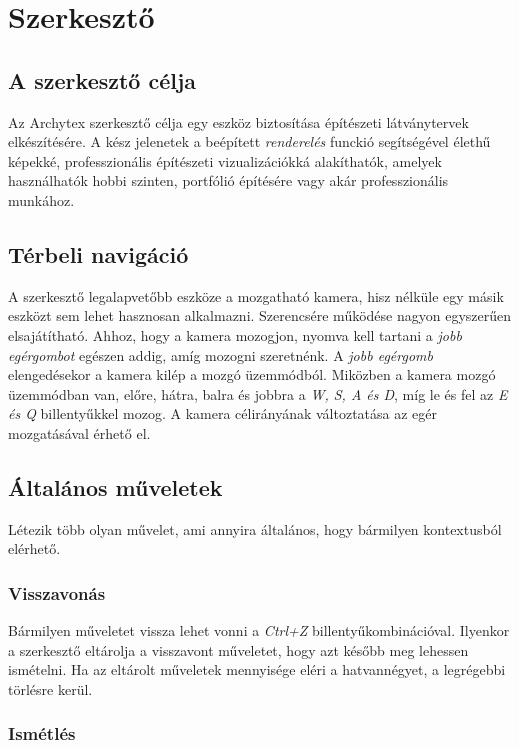 \section{Szerkesztő}

\subsection{A szerkesztő célja}

Az Archytex szerkesztő célja egy eszköz biztosítása építészeti látványtervek elkészítésére. A kész
jelenetek a beépített \emph{renderelés} funckió segítségével élethű képekké, professzionális
építészeti vizualizációkká alakíthatók, amelyek használhatók hobbi szinten, portfólió építésére vagy
akár professzionális munkához.

\subsection{Térbeli navigáció}

A szerkesztő legalapvetőbb eszköze a mozgatható kamera, hisz nélküle egy másik eszközt sem lehet
hasznosan alkalmazni. Szerencsére működése nagyon egyszerűen elsajátítható. Ahhoz, hogy a kamera
mozogjon, nyomva kell tartani a \emph{jobb egérgombot} egészen addig, amíg mozogni szeretnénk.
A \emph{jobb egérgomb} elengedésekor a kamera kilép a mozgó üzemmódból. Miközben a kamera mozgó
üzemmódban van, előre, hátra, balra és jobbra a \emph{W, S, A és D}, míg le és
fel az \emph{E és Q} billentyűkkel mozog. A kamera célirányának változtatása az egér mozgatásával
érhető el.

\subsection{Általános műveletek}

Létezik több olyan művelet, ami annyira általános, hogy bármilyen kontextusból elérhető.

\subsubsection{Visszavonás}

Bármilyen műveletet vissza lehet vonni a \emph{Ctrl+Z} billentyűkombinációval. Ilyenkor a
szerkesztő eltárolja a visszavont műveletet, hogy azt később meg lehessen ismételni. Ha az eltárolt
műveletek mennyisége eléri a hatvannégyet, a legrégebbi törlésre kerül.

\subsubsection{Ismétlés}

